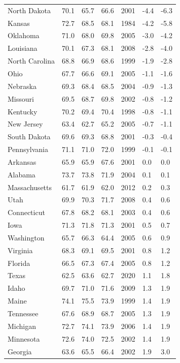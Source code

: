 \begin{longtable}{llllrll}
North Dakota & 70.1 & 65.7 & 66.6 & 2001 & -4.4 & -6.3 \\
Kansas & 72.7 & 68.5 & 68.1 & 1984 & -4.2 & -5.8 \\
Oklahoma & 71.0 & 68.0 & 69.8 & 2005 & -3.0 & -4.2 \\
Louisiana & 70.1 & 67.3 & 68.1 & 2008 & -2.8 & -4.0 \\
North Carolina & 68.8 & 66.9 & 68.6 & 1999 & -1.9 & -2.8 \\
Ohio & 67.7 & 66.6 & 69.1 & 2005 & -1.1 & -1.6 \\
Nebraska & 69.3 & 68.4 & 68.5 & 2004 & -0.9 & -1.3 \\
Missouri & 69.5 & 68.7 & 69.8 & 2002 & -0.8 & -1.2 \\
Kentucky & 70.2 & 69.4 & 70.4 & 1998 & -0.8 & -1.1 \\
New Jersey & 63.4 & 62.7 & 65.2 & 2005 & -0.7 & -1.1 \\
South Dakota & 69.6 & 69.3 & 68.8 & 2001 & -0.3 & -0.4 \\
Pennsylvania & 71.1 & 71.0 & 72.0 & 1999 & -0.1 & -0.1 \\
Arkansas & 65.9 & 65.9 & 67.6 & 2001 & 0.0 & 0.0 \\
Alabama & 73.7 & 73.8 & 71.9 & 2004 & 0.1 & 0.1 \\
Massachusetts & 61.7 & 61.9 & 62.0 & 2012 & 0.2 & 0.3 \\
Utah & 69.9 & 70.3 & 71.7 & 2008 & 0.4 & 0.6 \\
Connecticut & 67.8 & 68.2 & 68.1 & 2003 & 0.4 & 0.6 \\
Iowa & 71.3 & 71.8 & 71.3 & 2001 & 0.5 & 0.7 \\
Washington & 65.7 & 66.3 & 64.4 & 2005 & 0.6 & 0.9 \\
Virginia & 68.3 & 69.1 & 69.5 & 2001 & 0.8 & 1.2 \\
Florida & 66.5 & 67.3 & 67.4 & 2005 & 0.8 & 1.2 \\
Texas & 62.5 & 63.6 & 62.7 & 2020 & 1.1 & 1.8 \\
Idaho & 69.7 & 71.0 & 71.6 & 2009 & 1.3 & 1.9 \\
Maine & 74.1 & 75.5 & 73.9 & 1999 & 1.4 & 1.9 \\
Tennessee & 67.6 & 68.9 & 68.7 & 2005 & 1.3 & 1.9 \\
Michigan & 72.7 & 74.1 & 73.9 & 2006 & 1.4 & 1.9 \\
Minnesota & 72.6 & 74.0 & 72.5 & 2002 & 1.4 & 1.9 \\
Georgia & 63.6 & 65.5 & 66.4 & 2002 & 1.9 & 3.0 \\

\end{longtable}

